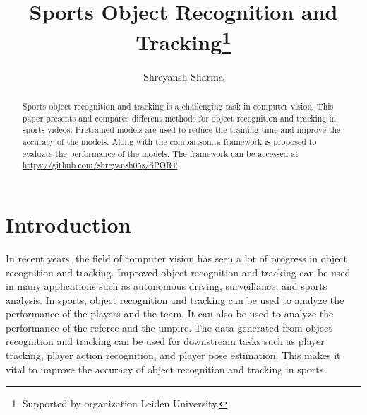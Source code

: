 \documentclass[runningheads]{llncs}
\begin{document}
%
\title{Sports Object Recognition and Tracking\thanks{Supported by organization Leiden University.}}
%
%
\author{Shreyansh Sharma }
%
%
%
\maketitle              %
%
\begin{abstract}
% 
Sports object recognition and tracking is a challenging task in computer vision. 
This paper presents and compares different methods for object recognition and tracking in sports videos.
Pretrained models are used to reduce the training time and improve the accuracy of the models.
Along with the comparison, a framework is proposed to evaluate the performance of the models.
The framework can be accessed at \url{https://github.com/shreyansh05s/SPORT}.
\end{abstract}
%
%
%
\section{Introduction}
In recent years, the field of computer vision has seen a lot of progress in object recognition and tracking.
Improved object recognition and tracking can be used in many applications such as autonomous driving, surveillance, and sports analysis.
In sports, object recognition and tracking can be used to analyze the performance of the players and the team.
It can also be used to analyze the performance of the referee and the umpire.
The data generated from object recognition and tracking can be used for downstream tasks such as player tracking, player action recognition, and player pose estimation.
This makes it vital to improve the accuracy of object recognition and tracking in sports.
\end{document}
